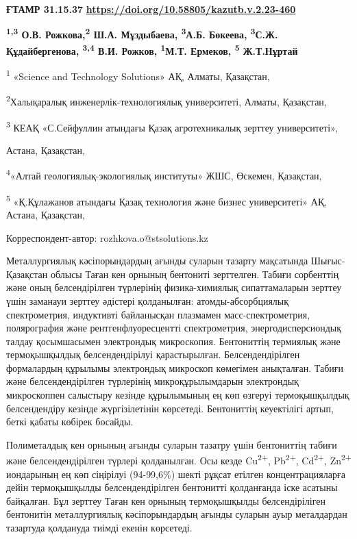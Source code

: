 \newpage
{\bfseries ҒТАМР 31.15.37}
\hfill {\bfseries \href{https://doi.org/10.58805/kazutb.v.2.23-460}{https://doi.org/10.58805/kazutb.v.2.23-460}}


\begin{center}
{\bfseries \textsuperscript{1,3} О.В. Рожкова,\textsuperscript{2} Ш.А. Мұздыбаева, \textsuperscript{3}А.Б. Бөкеева, \textsuperscript{3}С.Ж. Құдайбергенова, \textsuperscript{3,4} В.И. Рожков, \textsuperscript{1}М.Т. Ермеков, \textsuperscript{5} Ж.Т.Нұртай}

\textsuperscript{1} «Science and Technology Solutions» АҚ, Алматы,
Қазақстан,

\textsuperscript{2}Халықаралық инженерлік-технологиялық университеті,
Алматы, Қазақстан,

\textsuperscript{3} КЕАҚ «С.Сейфуллин атындағы Қазақ агротехникалық
зерттеу университеті»,

Астана, Қазақстан,

\textsuperscript{4}«Алтай геологиялық-экологиялық институты» ЖШС,
Өскемен, Қазақстан,

\textsuperscript{5} «Қ.Құлажанов атындағы Қазақ технология және бизнес
университеті» АҚ, Астана, Қазақстан,

Корреспондент-автор: rozhkova.o@stsolutions.kz
\end{center}

Металлургиялық кәсіпорындардың ағынды суларын тазарту мақсатында
Шығыс-Қазақстан облысы Таған кен орнының бентониті зерттелген. Табиғи
сорбенттің және оның белсендірілген түрлерінің физика-химиялық
сипаттамаларын зерттеу үшін заманауи зерттеу әдістері қолданылған:
атомды-абсорбциялық спектрометрия, индуктивті байланысқан плазмамен
масс-спектрометрия, полярография және рентгенфлуоресцентті
спектрометрия, энергодисперсиондық талдау қосымшасымен электрондық
микроскопия. Бентониттің термиялық және термоқышқылдық белсендендірілуі
қарастырылған. Белсендендірілген формалардың құрылымы электрондық
микроскоп көмегімен анықталған. Табиғи және белсендендірілген түрлерінің
микроқұрылымдарын электрондық микроскоппен салыстыру кезінде құрылымының
ең көп өзгеруі термоқышқылдық белсендендіру кезінде жүргізілетінін
көрсетеді. Бентониттің кеуектілігі артып, беткі қабаты көбірек босайды.

Полиметалдық кен орнының ағынды суларын тазатру үшін бентониттің табиғи
және белсендендірілген түрлері қолданылған. Осы кезде
Cu\textsuperscript{2+}, Pb\textsuperscript{2+}, Cd\textsuperscript{2+},
Zn\textsuperscript{2+} иондарының ең көп сіңірілуі (94-99,6\%) шекті
рұқсат етілген концентрацияларға дейін термоқышқылды белсендендірілген
бентонитті қолданғанда іске асатыны байқалған. Бұл зерттеу Таған кен
орнының термоқышқылды белсендіріліген бентонитін металлургиялық
кәсіпорындардың ағынды суларын ауыр металдардан тазартуда қолдануда
тиімді екенін көрсетеді.

